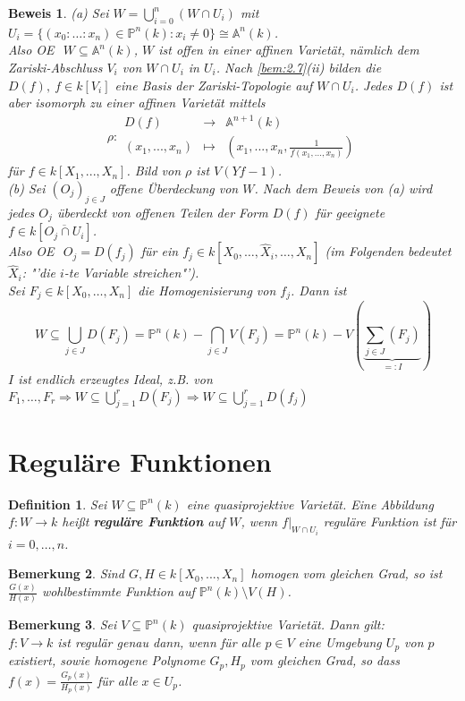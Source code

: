 \documentclass[a4paper,12pt]{report}
\theoremstyle{break}
\newtheorem{Def}{Definition}[section]
\newtheorem{Bem}[Def]{Bemerkung}
\theoremstyle{nonumberbreak}
\theoremstyle{nonumberplain}
\newtheorem{Bew}{Beweis}
\newcommand{\emp}[1]{\textbf{\emph{#1}}}
\newcommand{\begriff}[1]{{\index{#1}}\emp{#1}}
\newcommand{\Abb}[5]{\ensuremath{#1:\begin{array}{ccc} #2 & \longrightarrow & #3 \\ #4 & \longmapsto & #5 \end{array}}}
\renewcommand{\OE}{O\!\!E~}
\begin{document}
\begin{Bew}
(a) Sei $W=\bigcup_{i=0}^n(W\cap U_i)$ mit $U_i=\{(x_0:\dots:x_n)\in\mathbb{P}^n(k):x_i\neq 0\}\cong\mathbb{A}^n(k)$.\\
Also \OE $~W\subseteq\mathbb{A}^n(k)$, $W$ ist offen in einer affinen Varietät, nämlich dem Zariski-Abschluss $V_i$ von $W\cap U_i$ in $U_i$. Nach \ref{bem:2.7}(ii) bilden die $D(f),~f\in k[V_i]$ eine Basis der Zariski-Topologie auf $W\cap U_i$. Jedes $D(f)$ ist aber isomorph zu einer affinen Varietät mittels
$$\Abb{\rho}{D(f)}{\mathbb{A}^{n+1}(k)}{(x_1,...,x_n)}{(x_1,...,x_n,\frac{1}{f(x_1,...,x_n)})}$$
für $f\in k[X_1,...,X_n]$. Bild von $\rho$ ist $V(Yf-1)$.\\
(b) Sei $(O_j)_{j\in J}$ offene Überdeckung von $W$. Nach dem Beweis von (a) wird jedes $O_j$ überdeckt von offenen Teilen der Form $D(f)$ für geeignete $f\in k[\overline{O_j\cap U_i}]$.\\
Also \OE $~O_j=D(f_j)$ für ein $f_j\in k[X_0,\dots,\hat{X}_i,\dots,X_n]$ (im Folgenden bedeutet $\hat{X}_i$: "'die $i$-te Variable streichen"').\\
Sei $F_j\in k[X_0,\dots,X_n]$ die Homogenisierung von $f_j$. Dann ist
$$W\subseteq \bigcup_{j\in J}D(F_j)=\mathbb{P}^n(k) - \bigcap_{j\in J}V(F_j)=\mathbb{P}^n(k) - V(\underbrace{\sum_{j\in J}(F_j)}_{=:I})$$
$I$ ist endlich erzeugtes Ideal, z.B. von $F_1,\dots,F_r\Rightarrow W\subseteq\bigcup_{j=1}^rD(F_j)\Rightarrow W\subseteq \bigcup_{j=1}^rD(f_j)$
\end{Bew}


\section{Reguläre Funktionen}
\begin{Def}
\label{def:10.1}
Sei $W\subseteq\mathbb{P}^n(k)$ eine quasiprojektive Varietät. Eine Abbildung $f:W\rightarrow k$ heißt \begriff{reguläre Funktion} auf $W$, wenn $f|_{W\cap U_i}$ reguläre Funktion ist für $i=0,\dots,n$.
\end{Def}
\begin{Bem}
\label{bem:10.2}
Sind $G,H\in k[X_0,...,X_n]$ homogen vom gleichen Grad, so ist $\frac{G(x)}{H(x)}$ wohlbestimmte Funktion auf $\mathbb{P}^n(k)\setminus V(H)$.
\end{Bem}

\begin{Bem}
\label{bem:10.3}
Sei $V\subseteq\mathbb{P}^n(k)$ quasiprojektive Varietät. Dann gilt:\\
$f: V\rightarrow k$ ist regulär genau dann, wenn für alle $p\in V$ eine Umgebung $U_p$ von $p$ existiert, sowie homogene Polynome $G_p, H_p$ vom gleichen Grad, so dass $f(x)=\frac{G_p(x)}{H_p(x)}$ für alle $x\in U_p$.
\end{Bem}
\end{document}
